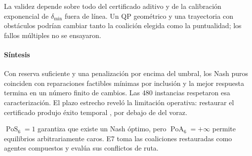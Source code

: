 La validez depende sobre todo del certificado aditivo y de la calibración exponencial de $\delta_{\min}$ fuera de línea. Un QP geométrico y una trayectoria con obstáculos podrían cambiar tanto la coalición elegida como la puntualidad; los fallos múltiples no se ensayaron.

\paragraph{Síntesis}

Con reserva suficiente y una penalización por encima del umbral, los Nash puros coinciden con reparaciones factibles mínimas por inclusión y la mejor respuesta termina en un número finito de cambios. Las 480 instancias respetaron esa caracterización. El plazo estrecho reveló la limitación operativa: restaurar el certificado produjo éxito temporal \SPSixTightPotentialSuccess{}, por debajo de \SPSixTightGreedySuccess{} del voraz.

$\operatorname{PoS}_6=1$ garantiza que existe un Nash óptimo, pero $\operatorname{PoA}_6=+\infty$ permite equilibrios arbitrariamente caros. E7 toma las coaliciones restauradas como agentes compuestos y evalúa sus conflictos de ruta.
